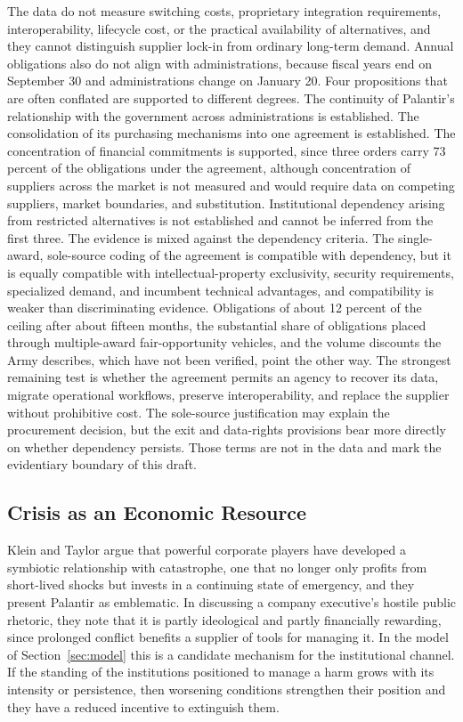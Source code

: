 \documentclass[12pt]{article}
\theoremstyle{remark}
\begin{document}
The data do not measure switching costs, proprietary integration requirements, interoperability, lifecycle cost, or the practical availability of alternatives, and they cannot distinguish supplier lock-in from ordinary long-term demand. Annual obligations also do not align with administrations, because fiscal years end on September 30 and administrations change on January 20. Four propositions that are often conflated are supported to different degrees. The continuity of Palantir's relationship with the government across administrations is established. The consolidation of its purchasing mechanisms into one agreement is established. The concentration of financial commitments is supported, since three orders carry 73 percent of the obligations under the agreement, although concentration of suppliers across the market is not measured and would require data on competing suppliers, market boundaries, and substitution. Institutional dependency arising from restricted alternatives is not established and cannot be inferred from the first three. The evidence is mixed against the dependency criteria. The single-award, sole-source coding of the agreement is compatible with dependency, but it is equally compatible with intellectual-property exclusivity, security requirements, specialized demand, and incumbent technical advantages, and compatibility is weaker than discriminating evidence. Obligations of about 12 percent of the ceiling after about fifteen months, the substantial share of obligations placed through multiple-award fair-opportunity vehicles, and the volume discounts the Army describes, which have not been verified, point the other way. The strongest remaining test is whether the agreement permits an agency to recover its data, migrate operational workflows, preserve interoperability, and replace the supplier without prohibitive cost. The sole-source justification may explain the procurement decision, but the exit and data-rights provisions bear more directly on whether dependency persists. Those terms are not in the data and mark the evidentiary boundary of this draft.

\subsection{Crisis as an Economic Resource}

Klein and Taylor argue that powerful corporate players have developed a symbiotic relationship with catastrophe, one that no longer only profits from short-lived shocks but invests in a continuing state of emergency, and they present Palantir as emblematic. In discussing a company executive's hostile public rhetoric, they note that it is partly ideological and partly financially rewarding, since prolonged conflict benefits a supplier of tools for managing it. In the model of Section~\ref{sec:model} this is a candidate mechanism for the institutional channel. If the standing of the institutions positioned to manage a harm grows with its intensity or persistence, then worsening conditions strengthen their position and they have a reduced incentive to extinguish them.
\end{document}
